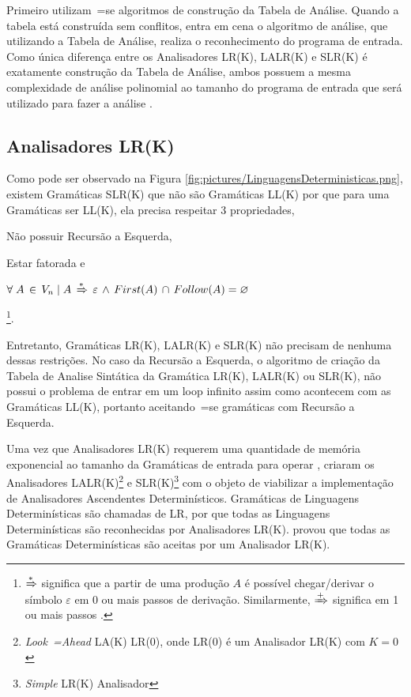 {    Primeiro utilizam~=se algoritmos de construção da Tabela de Análise.
    Quando a tabela está construída sem conflitos,
    entra em cena o algoritmo de análise,
    que utilizando a Tabela de Análise,
    realiza o reconhecimento do programa de entrada.
    Como única diferença entre os Analisadores LR(K),
    LALR(K) e
    SLR(K) é exatamente construção da Tabela de Análise,
    ambos possuem a mesma complexidade de análise polinomial ao tamanho do programa de entrada que será utilizado para fazer a análise \cite{linearLL1AndLR1Grammars,generalContextFreeParsingAlgorithm}.


\subsection{Analisadores LR(K)}

    Como pode ser observado na Figura \ref{fig:pictures/LinguagensDeterministicas.png},
    existem Gramáticas SLR(K) que não são Gramáticas LL(K) por que para uma Gramáticas ser LL(K),
    ela precisa respeitar 3 propriedades,
    \begin{inparaenum}
        \item Não possuir Recursão a Esquerda,
        \item Estar fatorada e
        \item $\forall\; A\, \in\, V_n\; |\; A\,
                \xRightarrow{*}\, \varepsilon\,
                \land\, First(A)\, \cap\, Follow(A) = \varnothing$
    \end{inparaenum}
    \cite{ahoCompilerDragonBook}\footnote{$\xRightarrow{*}$ significa que
    a partir de uma produção $A$ é possível chegar\slash{}derivar o
    símbolo $\varepsilon$ em 0 ou mais passos de derivação.
    Similarmente,
    $\xRightarrow{+}$ significa em 1 ou mais passos \cite{contextSensitiveParsing}.}.

    Entretanto,
    Gramáticas LR(K), LALR(K) e
    SLR(K) não precisam de nenhuma dessas restrições.
    No caso da Recursão a Esquerda,
    o algoritmo de criação da Tabela de Analise Sintática da Gramática LR(K),
    LALR(K) ou SLR(K),
    não possui o problema de entrar em um loop infinito assim como acontecem com as Gramáticas LL(K),
    portanto aceitando~=se gramáticas com Recursão a Esquerda.

    Uma vez que Analisadores LR(K) requerem uma quantidade de memória exponencial ao tamanho da Gramáticas de entrada para operar \cite{complexityOfLRKTesting},
     criaram os Analisadores LALR(K)\footnote{\textit{Look~=Ahead} LA(K) LR(0),
    onde LR(0) é um Analisador LR(K) com $K=0$
    } e
    SLR(K)\footnote{\textit{Simple} LR(K) Analisador} com o objeto de viabilizar a implementação de Analisadores Ascendentes Determinísticos.
    Gramáticas de Linguagens Determinísticas são chamadas de LR,
    por que todas as Linguagens Determinísticas são reconhecidas por Analisadores LR(K).
     provou que todas as Gramáticas Determinísticas são aceitas por um Analisador LR(K).

}
